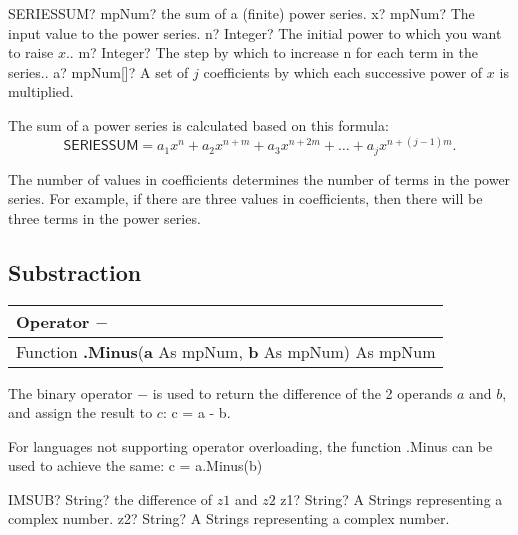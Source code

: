 \begin{mpFunctionsExtract}
	\mpWorksheetFunctionFour
	{SERIESSUM? mpNum? the sum of a (finite) power series.}
	{x? mpNum? The input value to the power series.}
	{n? Integer? The initial power to which you want to raise $x$..}
	{m? Integer? The step by which to increase n for each term in the series..}
	{a? mpNum[]? A set of $j$ coefficients by which each successive power of $x$ is multiplied.}
\end{mpFunctionsExtract}

\vspace{0.3cm}
The sum of a power series is calculated based on this formula:
\begin{equation}
	\textsf{SERIESSUM} = a_1x^n + a_2 x^{n+m} + a_3 x^{n+2m} + \ldots + a_j x^{n+(j-1)m}. 
\end{equation}

The number of values in coefficients determines the number of terms in the power series. For example, if there are three values in coefficients, then there will be three terms in the power series.




\subsection{Substraction}
\begin{tabular}{p{481pt}}
	\toprule
	\textsf{Operator \textbf{$-$}}\index{Multiprecision Functions!$-$} \\
	\midrule
	\textsf{Function \textbf{.Minus}(\textbf{a} As mpNum, \textbf{b} As mpNum) As mpNum}\index{Multiprecision Functions!.Minus} \\
	\bottomrule
\end{tabular}

\vspace{0.3cm}
The binary operator $-$ is used to return the difference of the 2 operands $a$ and $b$, and assign the result to $c$: \textsf{c = a - b}.

For languages not supporting operator overloading, the function \textsf{.Minus} can be used to achieve the same: \textsf{c = a.Minus(b)}




\vspace{0.6cm}
\begin{mpFunctionsExtract}
	\mpWorksheetFunctionTwoNotImplemented
	{IMSUB? String? the difference of $z1$ and $z2$}
	{z1? String? A Strings representing a complex number.}
	{z2? String? A Strings representing a complex number.}
\end{mpFunctionsExtract}



